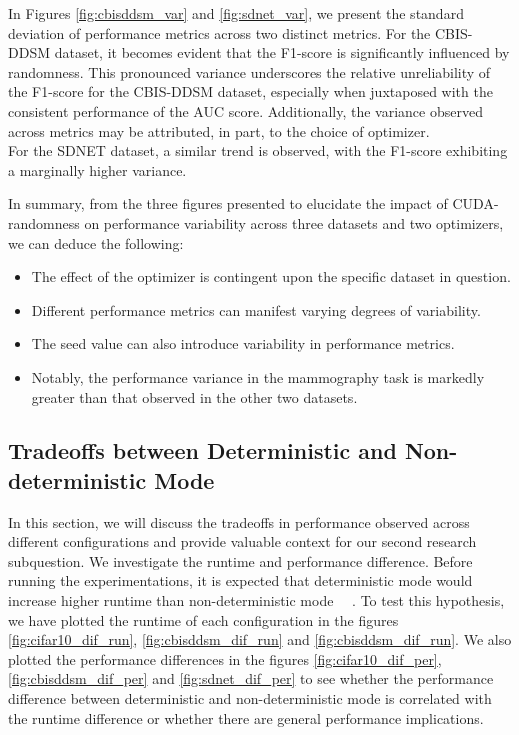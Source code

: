 In Figures \ref{fig:cbisddsm_var} and \ref{fig:sdnet_var}, we present the standard deviation of performance metrics across two distinct metrics. For the CBIS-DDSM dataset, it becomes evident that the F1-score is significantly influenced by randomness. This pronounced variance underscores the relative unreliability of the F1-score for the CBIS-DDSM dataset, especially when juxtaposed with the consistent performance of the AUC score. Additionally, the variance observed across metrics may be attributed, in part, to the choice of optimizer.\\

For the SDNET dataset, a similar trend is observed, with the F1-score exhibiting a marginally higher variance.

In summary, from the three figures presented to elucidate the impact of CUDA-randomness on performance variability across three datasets and two optimizers, we can deduce the following:

\begin{itemize}
    \item The effect of the optimizer is contingent upon the specific dataset in question.
    \item Different performance metrics can manifest varying degrees of variability.
    \item The seed value can also introduce variability in performance metrics.
    \item Notably, the performance variance in the mammography task is markedly greater than that observed in the other two datasets.
\end{itemize}

\subsection{Tradeoffs between Deterministic and Non-deterministic Mode}

In this section, we will discuss the tradeoffs in performance observed across different configurations and provide valuable context for our second research subquestion. We investigate the runtime and performance difference. Before running the experimentations, it is expected that deterministic mode would increase higher runtime than non-deterministic mode ~\cite{zhuang2022randomness}~\cite{pytorch_randomness}. To test this hypothesis, we have plotted the runtime of each configuration in the figures \ref{fig:cifar10_dif_run}, \ref{fig:cbisddsm_dif_run} and \ref{fig:cbisddsm_dif_run}. We also plotted the performance differences in the figures \ref{fig:cifar10_dif_per}, \ref{fig:cbisddsm_dif_per} and \ref{fig:sdnet_dif_per} to see whether the performance difference between deterministic and non-deterministic mode is correlated with the runtime difference or whether there are general performance implications.

